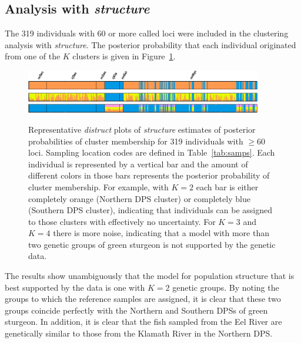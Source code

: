 \subsection{Analysis with {\em structure}}
The 319 individuals with 60 or more called loci were included in the clustering analysis with {\em structure}. 
The posterior probability that each 
individual originated from one of the $K$ clusters is given in Figure~\ref{fig:distruct}. 
\begin{figure}
\includegraphics[width = 0.92\textwidth]{inputs/BB_ds_Clumped_TopLabel_k002r001.pdf}~ \\
\includegraphics[width = 0.92\textwidth]{inputs/BB_ds_Clumped_NoLabel_k003r001.pdf}~ \\
\includegraphics[width = 0.92\textwidth]{inputs/BB_ds_Clumped_NoLabel_k004r001.pdf}~
\caption{ Representative {\em distruct} \protect\citep{rosenberg2004distruct} plots of {\em structure} estimates 
of posterior probabilities of cluster membership for 319 individuals with $\geq 60$ loci. Sampling location 
codes are defined in Table~\ref{tab:samps}. Each individual is represented by a vertical bar and the amount of different colors in those
bars represents the posterior probability of cluster membership. For example, with $K=2$ each bar is either completely orange (Northern 
DPS cluster) or completely blue (Southern DPS cluster), indicating that individuals can be assigned to those clusters with effectively 
no uncertainty. For $K=3$ and $K=4$ there is more noise, indicating that a model with more than two genetic groups of green sturgeon 
is not supported by the genetic data.\label{fig:distruct}}
\end{figure}
The results show unambiguously that the model for population structure that is best supported by the 
data is one with $K = 2$ genetic groups. By noting the groups to which the reference samples are assigned, it is clear 
that these two groups coincide perfectly with the Northern and Southern DPSs of green sturgeon. In addition, it is 
clear that the fish sampled from the Eel River are genetically similar to those from the Klamath River in the Northern DPS.


